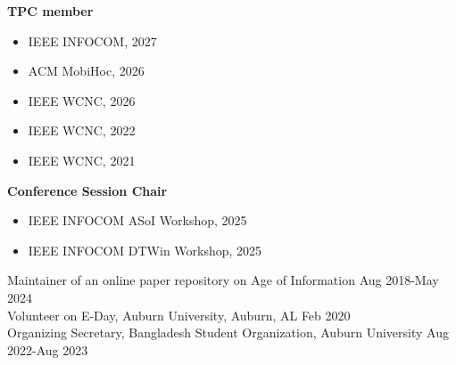 \documentclass[letterpaper,11pt]{article}
\begin{document}
{\bf TPC member}
\begin{itemize}
 \setlength\itemsep{-5pt}
    \item IEEE INFOCOM, 2027
    \item ACM MobiHoc, 2026
    \item IEEE WCNC, 2026
    \item IEEE WCNC, 2022
    \item IEEE WCNC, 2021
\end{itemize}
{\bf Conference Session Chair}
\begin{itemize}
 \setlength\itemsep{-5pt}
     \item IEEE INFOCOM ASoI Workshop, 2025
    \item IEEE INFOCOM DTWin Workshop, 2025 
\end{itemize}
Maintainer of an online paper repository on Age of Information \hfill Aug 2018-May 2024 \\
Volunteer on E-Day, Auburn University, Auburn, AL \hfill Feb 2020 \\
Organizing Secretary, Bangladesh Student Organization, Auburn University \hfill Aug 2022-Aug 2023 \\
\end{document}
